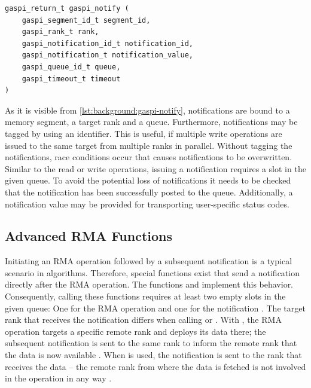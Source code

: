 \begin{lstlisting}[style=cpp,captionpos={b},caption={Function definition of \code{gaspi\_notify} {\cite[ch.~8.3.2]{gaspi-std}}.},label=lst:background:gaspi-notify]
gaspi_return_t gaspi_notify ( 
	gaspi_segment_id_t segment_id,
	gaspi_rank_t rank,
	gaspi_notification_id_t notification_id,
	gaspi_notification_t notification_value,
	gaspi_queue_id_t queue,
	gaspi_timeout_t timeout 
)
\end{lstlisting}

As it is visible from \autoref{lst:background:gaspi-notify}, notifications are bound to a memory segment, a target rank and a queue. Furthermore, notifications may be tagged by using an identifier. This is useful, if \eg multiple write operations are issued to the same target from multiple ranks in parallel. Without tagging the notifications, race conditions occur that causes notifications to be overwritten. Similar to the read or write operations, issuing a notification requires a slot in the given queue. To avoid the potential loss of notifications it needs to be checked that the notification has been successfully posted to the queue. Additionally, a notification value may be provided for transporting user-specific status codes.

\subsection{Advanced \acs{RMA} Functions}

Initiating an \ac{RMA} operation followed by a subsequent notification is a typical scenario in algorithms. Therefore, special functions exist that send a notification directly after the \ac{RMA} operation. The functions \gaspiWriteNotify and \gaspiReadNotify implement this behavior. Consequently, calling these functions requires at least two empty slots in the given queue: One for the \ac{RMA} operation and one for the notification \cite[ch.~8.4]{gaspi-std}. The target rank that receives the notification differs when calling  \gaspiWriteNotify or \gaspiReadNotify. With \gaspiWriteNotify, the \ac{RMA} operation targets a specific remote rank and deploys its data there; the subsequent notification is sent to the same rank to inform the remote rank that the data is now available \cite[ch.~8.4.1]{gaspi-std}. When \gaspiReadNotify is used, the notification is sent to the rank that receives the data -- the remote rank from where the data is fetched is not involved in the operation in any way \cite[ch.~8.4.4]{gaspi-std}.

